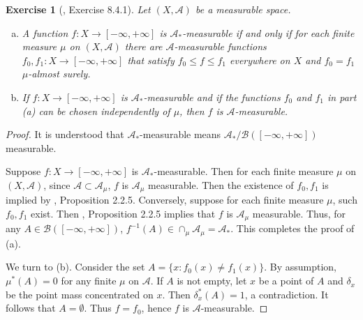 \documentclass[11pt]{article}
\theoremstyle{plain}
\newtheorem{exercise}{Exercise}
\theoremstyle{definition}
\theoremstyle{remark}
\begin{document}
\begin{exercise}[\cite{book:992991}, Exercise 8.4.1]
    Let $(X,\mathscr A)$ be a measurable space. 
    \begin{enumerate}[(a)]
        \item 
            A function $f: X\to [-\infty, + \infty]$ is $\mathscr A_*$-measurable if and only if for each finite measure $\mu$ on $ (X, \mathscr A)$ there are $\mathscr A $-measurable functions $f_0, f_1: X\to [-\infty, + \infty]$ that satisfy $f_0 \leq f \leq f_1$ everywhere on $X$ and $f_0=f_1$ $\mu$-almost surely.
        \item
            If $f: X\to [-\infty, + \infty]$ is $ \mathscr A_*$-measurable and if the functions $f_0$ and $f_1$ in part (a) can be chosen independently of $\mu$, then $f$ is $\mathscr A$-measurable.
    \end{enumerate}
\end{exercise}
\begin{proof}
    It is understood that $\mathscr A_*$-measurable means $\mathscr A_*/ \mathscr B([-\infty, +\infty])$ measurable.

    Suppose $f: X\to [-\infty, + \infty]$ is $\mathscr A_*$-measurable.
    Then for each finite measure $\mu$ on $(X, \mathscr A)$, since $\mathscr A \subset \mathscr A_\mu$, $f$ is $\mathscr A_\mu$ measurable.
    Then the existence of $f_0, f_1$ is implied by \cite{book:992991}, Proposition 2.2.5.
    Conversely, suppose for each finite measure $\mu$, such $f_0,f_1$ exist.
    Then \cite{book:992991}, Proposition 2.2.5 implies that $f$ is $\mathscr A_\mu$ measurable.
    Thus, for any $A \in \mathscr B ([-\infty, + \infty])$, $f^{-1}(A) \in \cap_{\mu} \mathscr A_\mu  = \mathscr A_*$.
    This completes the proof of (a).

    We turn to (b).
    Consider the set $A=\{x: f_0(x) \neq f_1(x)\}$.
    By assumption, $\mu^*(A)=0$ for any finite $\mu$ on $\mathscr A$.
    If $A$ is not empty, let $x$ be a point of $A$ and $\delta_x$ be the point mass concentrated on $x$.
    Then $\delta_x^* (A)=1$, a contradiction.
    It follows that $A= \emptyset$.
    Thus $f=f_0$, hence $f$ is $\mathscr A$-measurable.
\end{proof}
\end{document}
